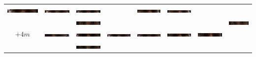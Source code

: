 \begin{tabular}{|c|c|c|c|c|c|c|c|}
\includegraphics[width=0.115\linewidth]{Auge1/A_Img5-2FalkoE.png} &
\includegraphics[width=0.115\linewidth]{Auge1/A_Img5-3FalkoE.png} &
\includegraphics[width=0.115\linewidth]{Auge1/A_Img5-4FalkoE.png} &
&
\includegraphics[width=0.115\linewidth]{Auge1/A_Img5-6FalkoE.png} &
\includegraphics[width=0.115\linewidth]{Auge1/A_Img5-7FalkoE.png} \\&
&
\includegraphics[width=0.115\linewidth]{Auge1/A_Img5-2ThomasE.png} &
&
&
&
&
\includegraphics[width=0.115\linewidth]{Auge1/A_Img5-7ThomasE.png} \\\hline 
$+4m$&
\includegraphics[width=0.115\linewidth]{Auge1/A_Img4-1FalkoE.png} &
\includegraphics[width=0.115\linewidth]{Auge1/A_Img4-2FalkoE.png} &
\includegraphics[width=0.115\linewidth]{Auge1/A_Img4-3FalkoE.png} &
\includegraphics[width=0.115\linewidth]{Auge1/A_Img4-4FalkoE.png} &
\includegraphics[width=0.115\linewidth]{Auge1/A_Img4-5FalkoE.png} &
\includegraphics[width=0.115\linewidth]{Auge1/A_Img4-6FalkoE.png} &
\\&
&
\includegraphics[width=0.115\linewidth]{Auge1/A_Img4-2ThomasE.png} &

\end{tabular}

